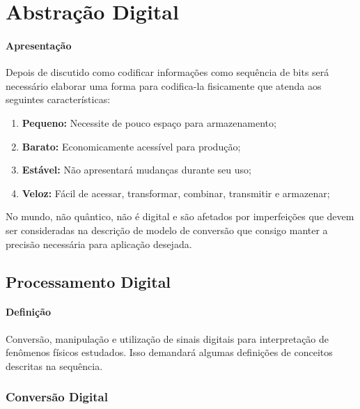 \documentclass{article}
\begin{document}
    \section{Abstração Digital}
        \paragraph{Apresentação}Depois de discutido como codificar informações como sequência de bits será necessário elaborar uma forma para codifica-la fisicamente que atenda aos seguintes características:
            \begin{enumerate}[noitemsep]
                \item \textbf{Pequeno:} Necessite de pouco espaço para armazenamento;
                \item \textbf{Barato:} Economicamente acessível para produção;
                \item \textbf{Estável:} Não apresentará mudanças durante seu uso;
                \item \textbf{Veloz:} Fácil de acessar, transformar, combinar, transmitir e armazenar;
            \end{enumerate}
        No mundo, não quântico, não é digital e são afetados por imperfeições que devem ser consideradas na descrição de modelo de conversão que consigo manter a precisão necessária para aplicação desejada.

        \subsection{Processamento Digital}
            \paragraph{Definição}Conversão, manipulação e utilização de sinais digitais para interpretação de fenômenos físicos estudados. Isso demandará algumas definições de conceitos descritas na sequência.

            \subsubsection{Conversão Digital}
\end{document}
